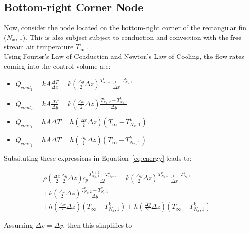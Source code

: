 \documentclass{article}
\newcommand{\ddfrac}[2]{\frac{\displaystyle #1}{\displaystyle #2}}
\begin{document}
\pagebreak

\subsection{Bottom-right Corner Node}
Now, consider the node located on the bottom-right corner of the rectangular fin ($N_x$, $1$). This is also subject subject to conduction and convection with the free stream air temperature $T_{\infty}$ .\\

Using Fourier's Law of Conduction and Newton's Law of Cooling, the flow rates coming into the control volume are:

\begin{itemize}
    \item $\dot{Q}_{cond_{1}} = kA\ddfrac{\Delta T}{\Delta x} = k(\ddfrac{\Delta y}{2} \Delta z) \ddfrac{T_{N_x-1,1}^k - T_{N_x,1}^k}{\Delta x}$
    \item $\dot{Q}_{cond_{2}} = kA\ddfrac{\Delta T}{\Delta y} = k(\ddfrac{\Delta x}{2} \Delta z) \ddfrac{T_{N_x,2}^k - T_{N_x,1}^k}{\Delta y}$
    \item $\dot{Q}_{conv_{1}} = hA\Delta T = h(\ddfrac{\Delta x}{2} \Delta z) \left(T_{\infty} - T_{N_x,1}^k\right)$
    \item $\dot{Q}_{conv_{2}} = hA\Delta T = h(\ddfrac{\Delta y}{2} \Delta z)\left(T_{\infty} - T_{N_x,1}^k\right)$
\end{itemize}

Subsituting these expressions in Equation~\eqref{eq:energy} leads to:

\begin{multline*}
    \rho\left(\ddfrac{\Delta x}{2} \ddfrac{\Delta y}{2} \Delta z\right) c_p \ddfrac{T_{N_x,1}^{k+1} - T_{N_x,1}^k}{\Delta t} = k(\ddfrac{\Delta y}{2} \Delta z) \ddfrac{T_{N_x-1,1}^k - T_{N_x,1}^k}{\Delta x} \\
    + k(\ddfrac{\Delta x}{2} \Delta z) \ddfrac{T_{N_x,2}^k - T_{N_x,1}^k}{\Delta y} \\
    + h(\ddfrac{\Delta x}{2} \Delta z) \left(T_{\infty} - T_{N_x,1}^k\right)
    + h(\ddfrac{\Delta y}{2} \Delta z)\left(T_{\infty} - T_{N_x,1}^k\right)
\end{multline*}

Assuming $\Delta x = \Delta y$, then this simplifies to 
\begin{center}
    \noindent {}        
\end{center}
\end{document}
